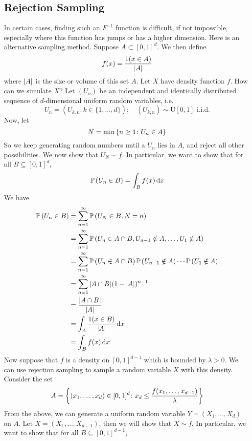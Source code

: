 \subsection{Rejection Sampling}
In certain cases, finding such an \(F^{-1}\) function is difficult, if not impossible, especially where this function has jumps or has a higher dimension. Here is an alternative sampling method. Suppose \(A \subset [0, 1]^d\). We then define
\[ f(x) = \frac{1(x \in A)}{\abs{A}} \]
where \(\abs{A}\) is the size or volume of this set \(A\). Let \(X\) have density function \(f\). How can we simulate \(X\)? Let \((U_n)\) be an independent and identically distributed sequence of \(d\)-dimensional uniform random variables, i.e.
\[ U_n = (U_{k, n} \colon k \in \{ 1, \dots, d \});\quad (U_{k, n}) \sim \mathrm{U}[0, 1] \text{ i.i.d.} \]
Now, let
\[ N = \min\qty{n \geq 1 \colon U_n \in A} \]
So we keep generating random numbers until a \(U_n\) lies in \(A\), and reject all other possibilities. We now show that \(U_N \sim f\). In particular, we want to show that for all \(B \subseteq [0, 1]^d\),
\[ \mathbb{P}\left({U_n \in B}\right) = \int_B f(x) \dd{x} \]
We have
\begin{align*}
	\mathbb{P}\left({U_n \in B}\right) & = \sum_{n=1}^\infty \mathbb{P}\left({U_N \in B, N = n}\right)                                                    \\
	                 & = \sum_{n=1}^\infty \mathbb{P}\left({U_n \in A \cap B, U_{n-1} \notin A, \dots, U_1 \notin A}\right)             \\
	                 & = \sum_{n=1}^\infty \mathbb{P}\left({U_n \in A \cap B}\right) \mathbb{P}\left({U_{n-1} \notin A}\right) \cdots \mathbb{P}\left({U_1 \notin A}\right) \\
	                 & = \sum_{n=1}^\infty \abs{A \cap B} (1 -\abs{A})^{n-1}                                          \\
	                 & = \frac{\abs{A \cap B}}{\abs{A}}                                                               \\
	                 & = \int_A \frac{1(x \in B)}{\abs{A}} \dd{x}                                                     \\
	                 & = \int_B f(x) \dd{x}
\end{align*}
Now suppose that \(f\) is a density on \([0, 1]^{d-1}\) which is bounded by \(\lambda > 0\). We can use rejection sampling to sample a random variable \(X\) with this density. Consider the set
\[ A = \qty{(x_1, \dots, x_d) \in [0, 1]^d \colon x_d \leq \frac{f(x_1, \dots, x_{d-1})}{\lambda}} \]
From the above, we can generate a uniform random variable \(Y = (X_1, \dots, X_d)\) on \(A\). Let \(X = (X_1, \dots, X_{d-1})\), then we will show that \(X \sim f\). In particular, we want to show that for all \(B \subseteq [0, 1]^{d-1}\),

